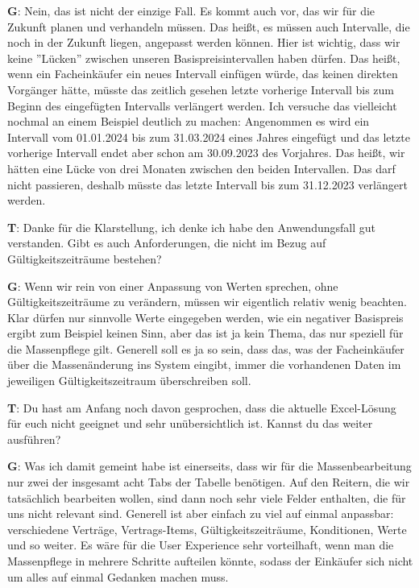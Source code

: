\begin{list}{X:}{\setlength{\labelsep}{5mm}}
 \item[\textbf{G}:] Nein, das ist nicht der einzige Fall. Es kommt auch vor, das wir für die Zukunft planen und verhandeln müssen. Das hei\ss t, es müssen auch Intervalle, die noch in der Zukunft liegen, angepasst werden können. Hier ist wichtig, dass wir keine ''Lücken'' zwischen unseren Basispreisintervallen haben dürfen. Das hei\ss t, wenn ein Facheinkäufer ein neues Intervall einfügen würde, das keinen direkten Vorgänger hätte, müsste das zeitlich gesehen letzte vorherige Intervall bis zum Beginn des eingefügten Intervalls verlängert werden. Ich versuche das vielleicht nochmal an einem Beispiel deutlich zu machen: Angenommen es wird ein Intervall vom 01.01.2024 bis zum 31.03.2024 eines Jahres eingefügt und das letzte vorherige Intervall endet aber schon am 30.09.2023 des Vorjahres. Das hei\ss t, wir hätten eine Lücke von drei Monaten zwischen den beiden Intervallen. Das darf nicht passieren, deshalb müsste das letzte Intervall bis zum 31.12.2023 verlängert werden.
 \item[\textbf{T}:] Danke für die Klarstellung, ich denke ich habe den Anwendungsfall gut verstanden. Gibt es auch Anforderungen, die nicht im Bezug auf Gültigkeitszeiträume bestehen?
 \item[\textbf{G}:] Wenn wir rein von einer Anpassung von Werten sprechen, ohne Gültigkeitszeiträume zu verändern, müssen wir eigentlich relativ wenig beachten. Klar dürfen nur sinnvolle Werte eingegeben werden, wie \zB ein negativer Basispreis ergibt zum Beispiel keinen Sinn, aber das ist ja kein Thema, das nur speziell für die Massenpflege gilt. Generell soll es ja so sein, dass das, was der Facheinkäufer über die Massenänderung ins System eingibt, immer die vorhandenen Daten im jeweiligen Gültigkeitszeitraum überschreiben soll.
 \item[\textbf{T}:] Du hast am Anfang noch davon gesprochen, dass die aktuelle Excel-Lösung für euch nicht geeignet und sehr unübersichtlich ist. Kannst du das weiter ausführen?
 \item[\textbf{G}:] Was ich damit gemeint habe ist einerseits, dass wir für die Massenbearbeitung nur zwei der insgesamt acht Tabs der Tabelle benötigen. Auf den Reitern, die wir tatsächlich bearbeiten wollen, sind dann noch sehr viele Felder enthalten, die für uns nicht relevant sind. Generell ist aber einfach zu viel auf einmal anpassbar: verschiedene Verträge, Vertrags-Items, Gültigkeitszeiträume, Konditionen, Werte und so weiter. Es wäre für die User Experience sehr vorteilhaft, wenn man die Massenpflege in mehrere Schritte aufteilen könnte, sodass der Einkäufer sich nicht um alles auf einmal Gedanken machen muss. 

\end{list}
